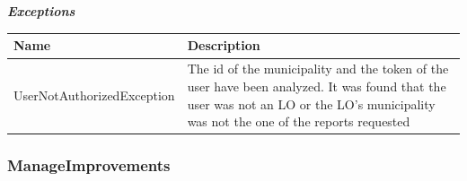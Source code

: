 							\subparagraph{}
								\textit{\textbf{Exceptions}}
									\begin{table}[!h]
									\begin{tabular}{L{0.3\textwidth}L{0.3\textwidth}}
										\toprule
										Name & Description \\
										\midrule
								  	UserNotAuthorizedException & The id of the municipality and the token of the user have been analyzed. It was found that the user was not an LO or the LO's  municipality was not the one of the reports requested  \\
								 		\bottomrule
									\end{tabular}
								\end{table}

				\subsubsection{ManageImprovements}

